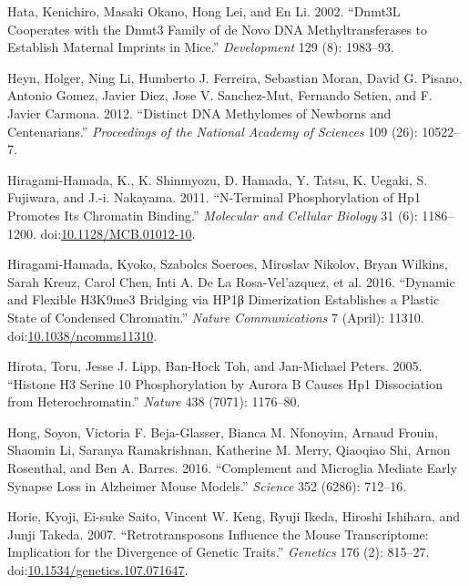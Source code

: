 \documentclass[onehalf,12pt]{beavtex}
\begin{document}
  \hypertarget{ref-HataDnmt3LcooperatesDnmt32002}{}
  Hata, Kenichiro, Masaki Okano, Hong Lei, and En Li. 2002. ``Dnmt3L
  Cooperates with the Dnmt3 Family of de Novo DNA Methyltransferases to
  Establish Maternal Imprints in Mice.'' \emph{Development} 129 (8):
  1983--93.
  
  \hypertarget{ref-HeynDistinctDNAmethylomes2012}{}
  Heyn, Holger, Ning Li, Humberto J. Ferreira, Sebastian Moran, David G.
  Pisano, Antonio Gomez, Javier Diez, Jose V. Sanchez-Mut, Fernando
  Setien, and F. Javier Carmona. 2012. ``Distinct DNA Methylomes of
  Newborns and Centenarians.'' \emph{Proceedings of the National Academy
  of Sciences} 109 (26): 10522--7.
  
  \hypertarget{ref-Hiragami-HamadaNTerminalPhosphorylationHP12011}{}
  Hiragami-Hamada, K., K. Shinmyozu, D. Hamada, Y. Tatsu, K. Uegaki, S.
  Fujiwara, and J.-i. Nakayama. 2011. ``N-Terminal Phosphorylation of Hp1
  Promotes Its Chromatin Binding.'' \emph{Molecular and Cellular Biology}
  31 (6): 1186--1200.
  doi:\href{https://doi.org/10.1128/MCB.01012-10}{10.1128/MCB.01012-10}.
  
  \hypertarget{ref-Hiragami-HamadaDynamicflexibleH3K9me32016}{}
  Hiragami-Hamada, Kyoko, Szabolcs Soeroes, Miroslav Nikolov, Bryan
  Wilkins, Sarah Kreuz, Carol Chen, Inti A. De La Rosa-Vel\a'azquez, et
  al. 2016. ``Dynamic and Flexible H3K9me3 Bridging via HP1β Dimerization
  Establishes a Plastic State of Condensed Chromatin.'' \emph{Nature
  Communications} 7 (April): 11310.
  doi:\href{https://doi.org/10.1038/ncomms11310}{10.1038/ncomms11310}.
  
  \hypertarget{ref-HirotaHistoneH3serine2005}{}
  Hirota, Toru, Jesse J. Lipp, Ban-Hock Toh, and Jan-Michael Peters. 2005.
  ``Histone H3 Serine 10 Phosphorylation by Aurora B Causes Hp1
  Dissociation from Heterochromatin.'' \emph{Nature} 438 (7071): 1176--80.
  
  \hypertarget{ref-HongComplementmicrogliamediate2016}{}
  Hong, Soyon, Victoria F. Beja-Glasser, Bianca M. Nfonoyim, Arnaud
  Frouin, Shaomin Li, Saranya Ramakrishnan, Katherine M. Merry, Qiaoqiao
  Shi, Arnon Rosenthal, and Ben A. Barres. 2016. ``Complement and
  Microglia Mediate Early Synapse Loss in Alzheimer Mouse Models.''
  \emph{Science} 352 (6286): 712--16.
  
  \hypertarget{ref-HorieRetrotransposonsInfluenceMouse2007a}{}
  Horie, Kyoji, Ei-suke Saito, Vincent W. Keng, Ryuji Ikeda, Hiroshi
  Ishihara, and Junji Takeda. 2007. ``Retrotransposons Influence the Mouse
  Transcriptome: Implication for the Divergence of Genetic Traits.''
  \emph{Genetics} 176 (2): 815--27.
  doi:\href{https://doi.org/10.1534/genetics.107.071647}{10.1534/genetics.107.071647}.
  
\end{document}
